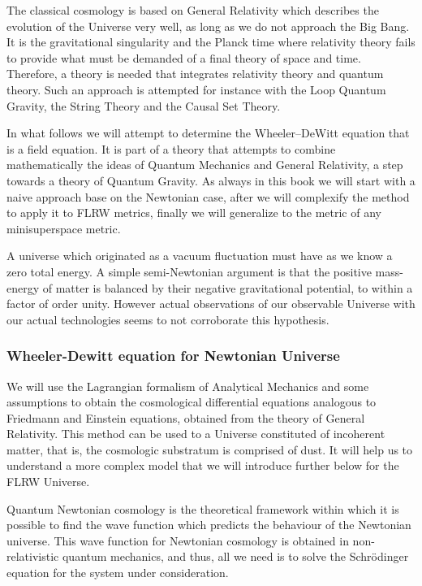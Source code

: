 	The classical cosmology is based on General Relativity which describes the evolution of the Universe very well, as long as we do not approach the Big Bang. It is the gravitational singularity and the Planck time where relativity theory fails to provide what must be demanded of a final theory of space and time. Therefore, a theory is needed that integrates relativity theory and quantum theory. Such an approach is attempted for instance with the Loop Quantum Gravity, the String Theory and the Causal Set Theory.
	
	In what follows we will attempt to determine the Wheeler–DeWitt equation that is a field equation. It is part of a theory that attempts to combine mathematically the ideas of Quantum Mechanics and General Relativity, a step towards a theory of Quantum Gravity. As always in this book we will start with a naive approach base on the Newtonian case, after we will complexify the method to apply it to FLRW metrics, finally we will generalize to the metric of any minisuperspace metric. 
	
	
	\begin{tcolorbox}[title=Remark,colframe=black,arc=10pt]
	A universe which originated as a vacuum fluctuation must have as we know a zero total energy. A simple semi-Newtonian argument is that the positive mass-energy of matter is balanced by their negative gravitational potential, to within a factor of order unity. However actual observations of our observable Universe with our actual technologies seems to not corroborate this hypothesis.
	\end{tcolorbox}
	
	\subsubsection{Wheeler-Dewitt equation for Newtonian Universe}
	We will use the Lagrangian formalism of Analytical Mechanics and some assumptions to obtain the cosmological differential equations analogous to Friedmann and Einstein equations, obtained from the theory of General Relativity. This method can be used to a Universe constituted of incoherent matter, that is, the cosmologic substratum is comprised of dust. It will help us to understand a more complex model that we will introduce further below for the FLRW Universe.
	
	Quantum Newtonian cosmology is the theoretical framework within which it is possible to find the wave function which predicts the behaviour of the Newtonian universe. This wave function for Newtonian cosmology is obtained in non-relativistic quantum mechanics, and thus, all we need is to solve the Schrödinger equation for the system under consideration.
	
